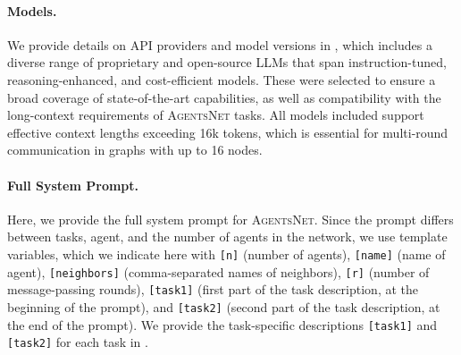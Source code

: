 \documentclass{article}
\newcommand{\benchmark}{\textsc{AgentsNet}}
\begin{document}
\paragraph{Models.}
We provide details on API providers and model versions in , which includes a diverse range of proprietary and open-source LLMs that span instruction-tuned, reasoning-enhanced, and cost-efficient models. These were selected to ensure a broad coverage of state-of-the-art capabilities, as well as compatibility with the long-context requirements of \benchmark{} tasks. All models included support effective context lengths exceeding 16k tokens, which is essential for multi-round communication in graphs with up to 16 nodes.

\paragraph{Full System Prompt.}
Here, we provide the full system prompt for \benchmark{}. Since the prompt differs between tasks, agent, and the number of agents in the network, we use template variables, which we indicate here with \texttt{[n]} (number of agents), \texttt{[name]} (name of agent), \texttt{[neighbors]} (comma-separated names of neighbors), \texttt{[r]} (number of message-passing rounds), \texttt{[task1]} (first part of the task description, at the beginning of the prompt), and \texttt{[task2]} (second part of the task description, at the end of the prompt). We provide the task-specific descriptions \texttt{[task1]} and \texttt{[task2]} for each task in .
\end{document}
